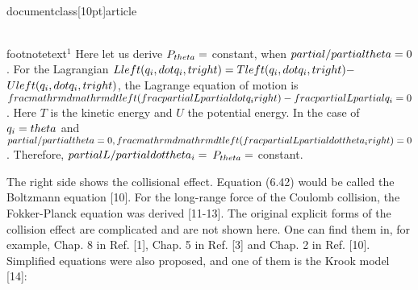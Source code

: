 \\documentclass[10pt]{article}
\begin{document}
{{{{\\footnotetext{${ }^{1}$ Here let us derive $P_{\\theta}=$ constant, when $\\partial / \\partial \\theta=0$. For the Lagrangian $L\\left(q_{i}, \\dot{q}_{i}, t\\right)=T\\left(q_{i}, \\dot{q}_{i}, t\\right)-$ $U\\left(q_{i}, \\dot{q}_{i}, t\\right)$, the Lagrange equation of motion is $\\frac{\\mathrm{d}}{\\mathrm{d} t}\\left(\\frac{\\partial L}{\\partial \\dot{q}_{i}}\\right)-\\frac{\\partial L}{\\partial q_{i}}=0$. Here $T$ is the kinetic energy and $U$ the potential energy. In the case of $q_{i}=\\theta$ and $\\partial / \\partial \\theta=0, \\frac{\\mathrm{d}}{\\mathrm{d} t}\\left(\\frac{\\partial L}{\\partial \\dot{\\theta}_{i}}\\right)=0$. Therefore, $\\partial L / \\partial \\dot{\\theta}_{i}=$ $P_{\\theta}=$ constant.
}

The right side shows the collisional effect. Equation (6.42) would be called the Boltzmann equation [10]. For the long-range force of the Coulomb collision, the Fokker-Planck equation was derived [11-13]. The original explicit forms of the collision effect are complicated and are not shown here. One can find them in, for example, Chap. 8 in Ref. [1], Chap. 5 in Ref. [3] and Chap. 2 in Ref. [10]. Simplified equations were also proposed, and one of them is the Krook model [14]:


}}}}
\end{document}
